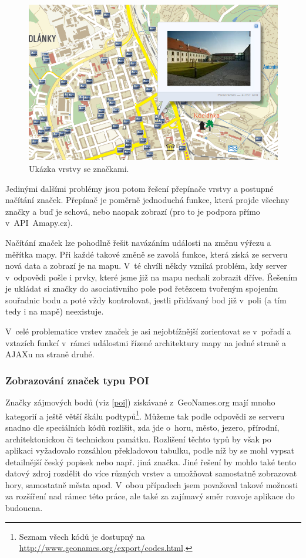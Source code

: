 \begin{figure}[h]
	\includegraphics[width=\textwidth, keepaspectratio]{fig/screenlayer}
	\caption{Ukázka vrstvy se značkami.}
	\label{obrLayer}
\end{figure}

Jedinými dalšími problémy jsou potom řešení přepínače vrstvy a
postupné načítání značek. Přepínač je poměrně jednoduchá funkce,
která projde všechny značky a buď je schová, nebo naopak zobrazí (pro
to je podpora přímo v~API~Amapy.cz).

Načítání značek lze pohodlně řešit navázáním události na změnu výřezu
a měřítka mapy. Při každé takové změně se zavolá funkce, která získá
ze serveru nová data a zobrazí je na mapu. V~té chvíli někdy
vzniká problém, kdy server v~odpovědi pošle i prvky, které jsme již
na mapu nechali zobrazit dříve. Řešením je ukládat si značky do
asociativního pole pod řetězcem tvořeným spojením souřadnic bodu a
poté vždy kontrolovat, jestli přidávaný bod již v~poli (a tím tedy i
na mapě) neexistuje.

V~celé problematice vrstev značek je asi nej\-obtížnější zorientovat se
v~pořadí a vztazích funkcí v~rámci událostmi řízené architektury mapy
na jedné straně a AJAXu na straně druhé.

\subsubsection{Zobrazování značek typu POI}
Značky zájmových bodů (viz \ref{poi}) získávané z~GeoNames.org mají
mnoho kategorií a ještě větší škálu podtypů\footnote{Seznam všech
kódů je dostupný na \url{http://www.geonames.org/export/codes.html}.}.
Můžeme tak podle odpovědi ze serveru snadno dle speciálních kódů
rozlišit, zda jde o~horu, město, jezero, přírodní, architektonickou
či technickou památku. Rozlišení těchto typů by však po aplikaci
vyžadovalo rozsáhlou překladovou tabulku, podle níž by se mohl vypsat
detailnější český popisek nebo např. jiná značka. Jiné řešení by
mohlo také tento datový zdroj rozdělit do více různých vrstev a
umožňovat samostatně zobrazovat hory, samostatně města apod. V~obou
případech jsem považoval takové možnosti za rozšíření nad rámec této
práce, ale také za zajímavý směr rozvoje aplikace do budoucna.

